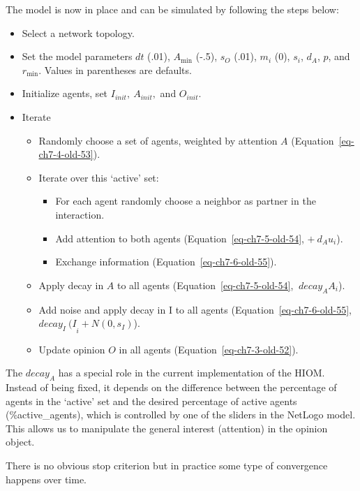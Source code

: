 \documentclass[
  a4paper,
  DIV=11,
  numbers=noendperiod]{scrreprt}
\begin{document}
The model is now in place and can be simulated by following the steps
below:

\begin{itemize}
\item
  Select a network topology.
\item
  Set the model parameters \(dt\) (.01), \(A_{\min}\) (-.5), \(s_{O}\)
  (.01), \(m_{i}\) (0), \(s_{i}\), \(d_{A}\), \(p\), and \(r_{\min}\).
  Values in parentheses are defaults.
\item
  Initialize agents, set \(I_{init},\ A_{init},\) and \(O_{init}\).
\item
  Iterate

  \begin{itemize}
  \item
    Randomly choose a set of agents, weighted by attention \(A\)
    (Equation~\ref{eq-ch7-4-old-53}).
  \item
    Iterate over this `active' set:

    \begin{itemize}
    \item
      For each agent randomly choose a neighbor as partner in the
      interaction.
    \item
      Add attention to both agents (Equation~\ref{eq-ch7-5-old-54},
      \(+ \ d_{A}u_{i}\)).
    \item
      Exchange information (Equation~\ref{eq-ch7-6-old-55}).
    \end{itemize}
  \item
    Apply decay in \(A\) to all agents (Equation~\ref{eq-ch7-5-old-54},
    \({\ decay}_{A}A_{i}\)).
  \item
    Add noise and apply decay in I to all agents
    (Equation~\ref{eq-ch7-6-old-55},
    \({decay_{I}\ (I}_{i} + Ν(0,s_{I})\)).
  \item
    Update opinion \(O\) in all agents (Equation~\ref{eq-ch7-3-old-52}).
  \end{itemize}
\end{itemize}

The \({decay}_{A}\) has a special role in the current implementation of
the HIOM. Instead of being fixed, it depends on the difference between
the percentage of agents in the `active' set and the desired percentage
of active agents (\%active\_agents), which is controlled by one of the
sliders in the NetLogo model. This allows us to manipulate the general
interest (attention) in the opinion object.

There is no obvious stop criterion but in practice some type of
convergence happens over time.
\end{document}
